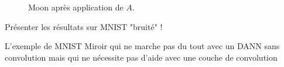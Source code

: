 \begin{figure}[htbp]
\centering
{}
\hfill
{}
\caption{Moon après application de $A$.}
\end{figure}


\FloatBarrier

\TODO Présenter les résultats sur MNIST "bruité" !

\TODO L'exemple de MNIST Miroir qui ne marche pas du tout avec un DANN sans
convolution mais qui ne nécessite pas d'aide avec une couche de convolution


